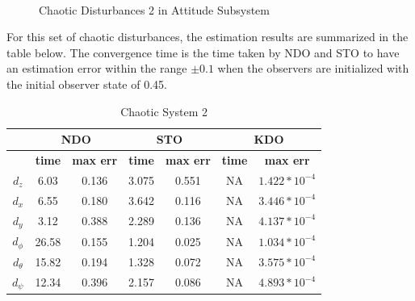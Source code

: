 \documentclass[letterpaper%
, twoside%
, 12pt%
,memoire%
, english%
,creativecommons,hyperref%
]{thETS}
\theoremstyle{newThmStyle}
\begin{document}
\begin{figure}[H]
\centering
{}
\\ \parbox{0.75\textwidth}{\caption{Chaotic Disturbances 2 in Attitude Subsystem} \label{dis_m2_att}}
\end{figure}

For this set of chaotic disturbances, the estimation results are summarized in the table below. The convergence time is the time taken by NDO and STO to have an estimation error within the range $\pm0.1$ when the observers are initialized with the initial observer state of 0.45. 

\begin{table}[!htbp]
\centering
\caption{Chaotic System 2}
\begin{tabular}{|c|c|c|c|c|c|c|}
\hline
{}  &  \multicolumn{2}{c|}{\textbf{NDO}} & \multicolumn{2}{c|}{\textbf{STO}} & \multicolumn{2}{c|}{\textbf{KDO}}\\
\hline
{}        &  \textbf{time}  & \textbf{max err}  & \textbf{time}  & \textbf{max err}& \textbf{time}  & \textbf{max err}\\
$d_z$     &  6.03 & 0.136   & 3.075  & 0.551 & NA     & $1.422*10^{-4}$\\
$d_x$     &  6.55 & 0.180   & 3.642  & 0.116 & NA     & $3.446*10^{-4}$\\
$d_y$     &  3.12 & 0.388   & 2.289  & 0.136 & NA     & $4.137*10^{-4}$\\
$d_\phi$  &  26.58& 0.155   & 1.204  & 0.025 & NA     & $1.034*10^{-4}$\\
$d_\theta$&  15.82& 0.194   & 1.328  & 0.072 & NA     & $3.575*10^{-4}$\\
$d_\psi$  &  12.34& 0.396   & 2.157  & 0.086 & NA     & $4.893*10^{-4}$\\

\hline
\end{tabular}
\end{table}
\end{document}
